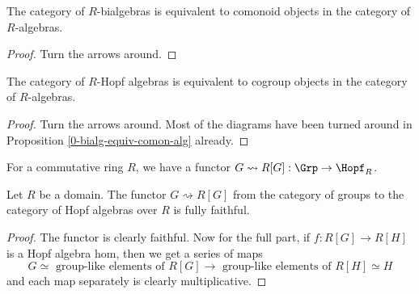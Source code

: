 \begin{proposition}
  \label{0-bialg-equiv-comon-alg}
  \uses{}
  \leanok

  The category of $R$-bialgebras is equivalent to comonoid objects in the category of $R$-algebras.
\end{proposition}
\begin{proof}
  \uses{}
  \leanok

  Turn the arrows around.
\end{proof}


\begin{proposition}
  \label{0-hopf-alg-equiv-cogrp-alg, 0-antipode-mul}
  \uses{}
  \leanok

  The category of $R$-Hopf algebras is equivalent to cogroup objects in the category of $R$-algebras.
\end{proposition}
\begin{proof}
  \leanok

  Turn the arrows around.
  Most of the diagrams have been turned around in Proposition \ref{0-bialg-equiv-comon-alg} already.
\end{proof}


\begin{definition}
  \label{0-grp-alg}
  \uses{}
  \leanok

  For a commutative ring $R$, we have a functor $G \rightsquigarrow R[G] : \Grp \to \Hopf_R$.
\end{definition}


\begin{proposition}
  \label{0-full-faithful-grp-alg}
  \leanok

  Let $R$ be a domain.
  The functor $G \rightsquigarrow R[G]$ from the category of groups to the category of Hopf algebras over $R$ is fully faithful.
\end{proposition}
\begin{proof}
  \leanok

  The functor is clearly faithful.
  Now for the full part, if $f : R[G] \to R[H]$ is a Hopf algebra hom, then we get a series of maps
  \[
    G \simeq \text{ group-like elements of } R[G] \to \text{ group-like elements of } R[H] \simeq H
  \]
  and each map separately is clearly multiplicative.
\end{proof}
